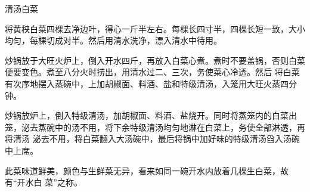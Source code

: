 \begin{recipe}[开水白菜]{清汤白菜}

\ingredients


\preparation

\step 将黄秧白菜四棵去净边叶，得心一斤半左右。每棵长四寸半，四棵长短一致，大小
均匀，每棵切成对半。然后用清水洗净，漂入清水中待用。

\step 炒锅放于大旺火炉上，倒入开水四斤，再放入白菜心煮。煮时不要盖锅，否则白菜
便要变色。煮至八分火\footnotemark 时捞出，用清水过二、三次，务使菜心冷透。然后
将白菜有次序地摆入蒸碗中，上加胡椒面、料酒、盐和特级清汤，入笼用大旺火蒸四分
钟。

\step 炒锅放炉上，倒入特级清汤，加胡椒面、料酒、盐烧开。同时将蒸笼内的白菜出
笼，泌去蒸碗中的汤不用，将下余特级清汤均匀地淋在白菜上，务使全部淋透，再将清汤
泌去不用，将白菜翻入大汤碗中，最后将锅中加好味的特级清汤舀入汤碗中上席。

\features

此菜味道鲜美，颜色与生鲜菜无异，看来如同一碗开水内放着几棵生白菜，故有“开水白
菜”之称。


\end{recipe}

